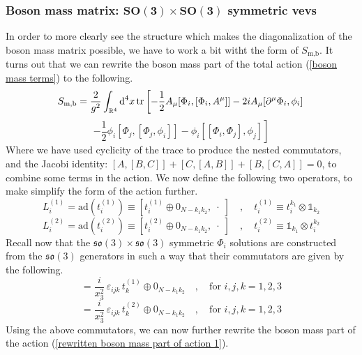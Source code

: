 \subsubsection[Boson mass matrix: $SO(3) \times SO(3)$ symmetric vevs]{Boson mass matrix: $\mathbf{SO(3) \times SO(3)}$ symmetric vevs}
In order to more clearly see the structure which makes the diagonalization of the boson mass matrix possible, we have to work a bit witht the form of $S_{\text{m,b}}$. It turns out that we can rewrite the boson mass part of the total action (\ref{boson mass terms}) to the following.
%
%
\begin{equation*}
S_{\text{m,b}}
=
\frac{2}{g^2} \int_{\mathbb{R}^4} \text{d}^4 x 
\tr \left[
- \frac{1}{2} A_\mu [\Phi_i, [\Phi_i, A^\mu]]
- 2 i A_\mu [\partial^\mu \Phi_i, \phi_i]
\right.
\end{equation*}
%
%
\begin{equation}\label{rewritten boson mass part of action 1}
\left.
- \frac{1}{2} \phi_i [\Phi_j, [\Phi_j, \phi_i]]
- \phi_i [[\Phi_i, \Phi_j], \phi_j]
\right]
\end{equation}
%
%
Where we have used cyclicity of the trace to produce the nested commutators, and the Jacobi identity: $[A,[B,C]] + [C,[A,B]] + [B,[C,A]] = 0$, to combine some terms in the action. We now define the following two operators, to make simplify the form of the action further.
%
%
\begin{equation}
L^{(1)}_i
=
\mathrm{ad}(t_i^{(1)})
\equiv
[t_i^{(1)} \oplus 0_{N - k_1 k_2}, \; \cdot \;]
%
\quad , \quad
%
t_i^{(1)}
\equiv
t^{k_1}_i \otimes \mathbb{1}_{k_2}
\end{equation}
%
%
\begin{equation}
L^{(2)}_i
= 
\mathrm{ad}(t_i^{(2)})
\equiv
[t_i^{(2)} \oplus 0_{N - k_1 k_2}, \; \cdot \;]
%
\quad , \quad
%
t_i^{(2)}
\equiv
\mathbb{1}_{k_1} \otimes t^{k_2}_i
\end{equation}
%
%
Recall now that the $\mathfrak{so}(3) \times \mathfrak{so}(3)$ symmetric $\Phi_i$ solutions are constructed from the $\mathfrak{so}(3)$ generators in such a way that their commutators are given by the following.
%
%
\begin{equation}
[\Phi_i, \Phi_j] = \frac{i}{x_3^2} \,
\varepsilon_{ijk} \, t_k^{(1)} \oplus 0_{N - k_1 k_2}
\quad , \quad
%
\text{for } i,j,k = 1,2,3
\end{equation}
%
%
\begin{equation}
[\Phi_{i+3}, \Phi_{j+3}] = \frac{i}{x_3^2} \,
\varepsilon_{ijk} \, t_k^{(2)} \oplus 0_{N - k_1 k_2}
\quad , \quad
%
\text{for } i,j,k = 1,2,3
\end{equation}
%
%
Using the above commutators, we can now further rewrite the boson mass part of the action (\ref{rewritten boson mass part of action 1}).


